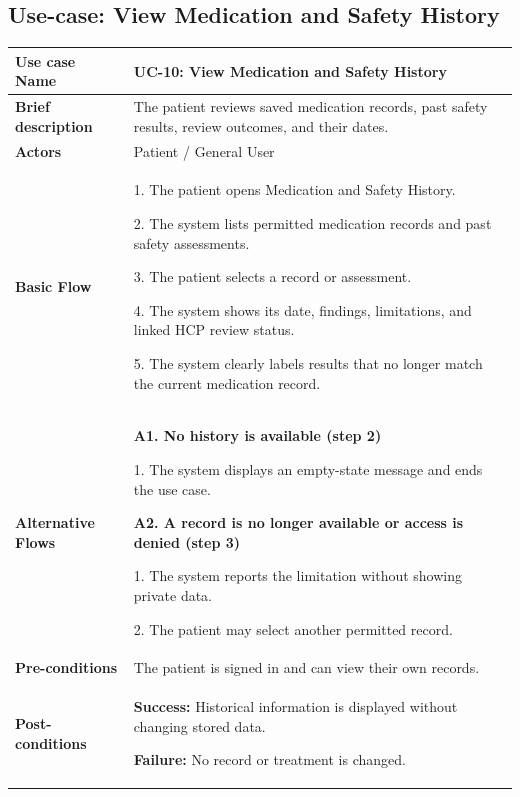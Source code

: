 \subsection{Use-case: View Medication and Safety History}
\label{uc:uc-10}
\begin{longtable}{|p{}|p{}|}
\hline
\textbf{Use case Name} & UC-10: View Medication and Safety History \\ \hline
\textbf{Brief description} & The patient reviews saved medication records, past safety results, review outcomes, and their dates. \\ \hline
\textbf{Actors} & Patient / General User \\ \hline
\textbf{Basic Flow} &
1. The patient opens Medication and Safety History.\par
2. The system lists permitted medication records and past safety assessments.\par
3. The patient selects a record or assessment.\par
4. The system shows its date, findings, limitations, and linked HCP review status.\par
5. The system clearly labels results that no longer match the current medication record.
\\ \hline
\textbf{Alternative Flows} &
\textbf{A1. No history is available (step 2)}\par
1. The system displays an empty-state message and ends the use case.
\par\smallskip
\textbf{A2. A record is no longer available or access is denied (step 3)}\par
1. The system reports the limitation without showing private data.\par
2. The patient may select another permitted record.
\\ \hline
\textbf{Pre-conditions} & The patient is signed in and can view their own records. \\ \hline
\textbf{Post-conditions} & \textbf{Success:} Historical information is displayed without changing stored data.\par
\textbf{Failure:} No record or treatment is changed. \\ \hline
\end{longtable}
\clearpage
